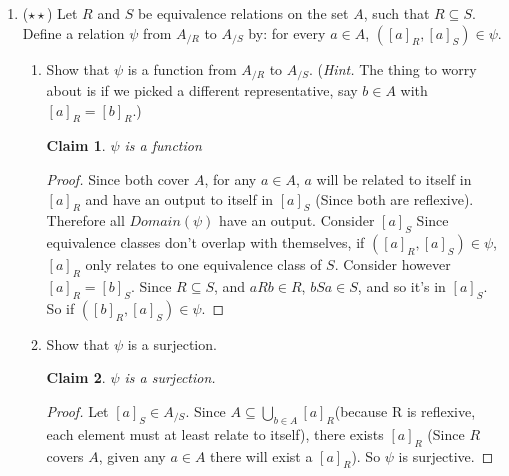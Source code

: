 \documentclass[11pt]{letter}
\newtheorem{claim}{Claim}
\theoremstyle{definition}
\begin{document}
\begin{description}
\begin{enumerate}
\begin{enumerate}
			\end{enumerate}
		\item ($\star \star$) Let $R$ and $S$ be equivalence relations on the set $A$, such that $R\subseteq S$. Define a relation $\psi$ from $A_{/R}$ to $A_{/S}$ by: for every $a\in A$, $([a]_R,[a]_S)\in \psi$.
			\begin{enumerate}
                        \item Show that $\psi$ is a function from $A_{/R}$ to $A_{/S}$. ({\em Hint.} The thing to worry about is if we picked a different representative, say $b\in A$ with $[a]_R=[b]_R$.)
                          \begin{claim}
                            $\psi$ is a function
                          \end{claim}
                          \begin{proof}
                            Since both cover $A$, for any $a\in A$, $a$ will be related to itself in $[a]_R$ and have an output to itself in $[a]_S$ (Since both are reflexive). Therefore all $Domain(\psi)$ have an output. Consider $[a]_S$ Since equivalence classes don't overlap with themselves, if $([a]_R,[a]_S)\in \psi$,  $[a]_R$ only relates to one equivalence class of $S$. Consider however $[a]_R=[b]_S$. Since $R\subseteq S$, and $aRb\in R$, $bSa\in S$, and so it's in $[a]_S$. So if $([b]_R,[a]_S)\in \psi$. 
                          \end{proof}
                          
				\item Show that $\psi$ is a surjection.
                                  \begin{claim}
                                    $\psi$ is a surjection.
                                  \end{claim}
                                  \begin{proof}
                                    Let $[a]_S\in A_{/S}$. Since $A\subseteq \bigcup_{b\in A}[a]_R$(because R is reflexive, each element must at least relate to itself), there exists $[a]_R$ (Since $R$ covers $A$, given any $a\in A$ there will exist a $[a]_R$). So $\psi$ is surjective. 
                                  \end{proof}
                                  

\end{enumerate}
\end{enumerate}
\end{description}
\end{document}
